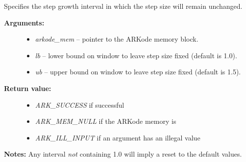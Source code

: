 \documentclass[letterpaper,10pt,english]{sphinxmanual}
\begin{document}
\begin{fulllineitems}
\label{c_interface/User_callable:c.ARKodeSetFixedStepBounds}
Specifies the step growth interval in which the step size will remain unchanged.
\begin{description}
\item[{\textbf{Arguments:}}] \leavevmode\begin{itemize}
\item {} 
\emph{arkode\_mem} -- pointer to the ARKode memory block.

\item {} 
\emph{lb} -- lower bound on window to leave step size fixed (default is 1.0).

\item {} 
\emph{ub} -- upper bound on window to leave step size fixed (default is 1.5).

\end{itemize}

\item[{\textbf{Return value:}}] \leavevmode\begin{itemize}
\item {} 
\emph{ARK\_SUCCESS} if successful

\item {} 
\emph{ARK\_MEM\_NULL} if the ARKode memory is 

\item {} 
\emph{ARK\_ILL\_INPUT} if an argument has an illegal value

\end{itemize}

\end{description}

\textbf{Notes:} Any interval \emph{not} containing 1.0 will imply a reset to the default values.

\end{fulllineitems}

\end{document}

